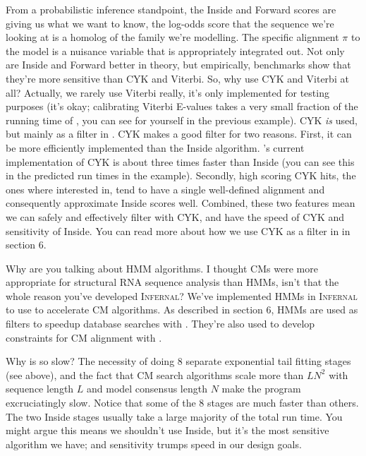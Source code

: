 From a probabilistic inference standpoint, the Inside and Forward
scores are giving us what we want to know, the log-odds score that the
sequence we're looking at is a homolog of the family we're
modelling. The specific alignment $\pi$ to the model is a nuisance
variable that is appropriately integrated out. Not only are Inside and
Forward better in theory, but empirically, benchmarks show that
they're more sensitive than CYK and Viterbi. So, why use CYK and
Viterbi at all?  Actually, we rarely use Viterbi really, it's
only implemented for testing purposes (it's okay; calibrating Viterbi
E-values takes a very small fraction of the running time of
, you can see for yourself in the previous
example). CYK \emph{is} used, but mainly as a filter in
. CYK makes a good filter for two reasons. First, it can be
more efficiently implemented than the Inside
algorithm. 's current implementation of CYK is
about three times faster than Inside (you can see this in the
predicted run times in the  example). Secondly,
high scoring CYK hits, the ones where interested in, tend to have a
single well-defined alignment and consequently approximate Inside
scores well. Combined, these two features mean we can safely and
effectively filter with CYK, and have the speed of CYK and sensitivity
of Inside. You can read more about how we use CYK as a filter in
 in section 6.


\begin{srefaq}{Why are you talking about HMM algorithms. I thought CMs
    were more appropriate for structural RNA sequence analysis than
    HMMs, isn't that the whole reason you've developed \textsc{Infernal}?} 
  We've implemented HMMs in \textsc{Infernal} to use to accelerate CM
    algorithms. As described in section 6, HMMs are used as filters to
    speedup database searches with . They're also used to develop
    constraints for CM alignment with .  
\end{srefaq}


\begin{srefaq}{Why is  so slow?} The
    necessity of doing 8 separate exponential tail fitting stages
    (see above), and the fact that CM search algorithms scale more
    than $LN^2$ with sequence length $L$ and model consensus length
    $N$ make the program excruciatingly slow. Notice that some of the
    8 stages are much faster than others. The two Inside stages usually
    take a large majority of the total run time. You might argue this
    means we shouldn't use Inside, but it's the most sensitive
    algorithm we have; and sensitivity trumps speed in our design
    goals.
\end{srefaq}

